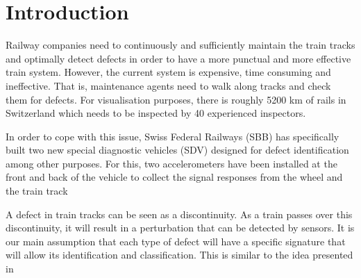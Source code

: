 



%



\maketitle

%
{
  \hypersetup{linkcolor=black}
  \tableofcontents
   
}
\newpage
\chapter{Introduction}
Railway companies need to continuously and sufficiently maintain the train tracks and optimally detect defects in order to have a more punctual and more effective train system. However, the current system is expensive, time consuming and ineffective. That is, maintenance agents need to walk along tracks and check them for defects. For visualisation purposes, there is roughly 5200 km of rails in Switzerland which needs to be inspected by 40 experienced inspectors.


In order to cope with this issue, Swiss Federal Railways (SBB) has specifically built two new special diagnostic vehicles (SDV) designed for defect identification among other purposes. For this, two accelerometers have been installed at the front and back of the vehicle to collect the signal responses from the wheel and the train track

A defect in train tracks can be seen as a discontinuity. As a train passes over this discontinuity, it will result in a perturbation that can be detected by sensors. It is our main assumption that each type of defect will have a specific signature that will allow its identification and classification. This is similar to the idea presented in 

